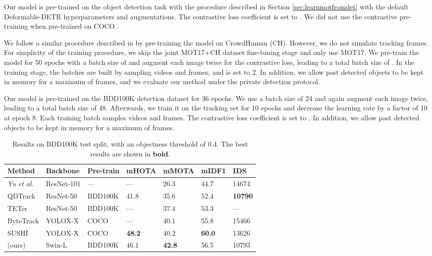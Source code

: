 Our model is pre-trained on the object detection task with the procedure described in Section \ref{sec:learnmotfromdet} with the default Deformable-DETR hyperparameters and augmentations. The contrastive loss coefficient is set to . We did not use the contrastive pre-training when pre-trained on COCO \cite{lin2014microsoft}.

 We follow a similar procedure described in \cite{zhou2020tracking} by pre-training the model on CrowdHuman (CH)\cite{shao2018crowdhuman}. However, we do not simulate tracking frames. For simplicity of the training procedure, we skip the joint MOT17+CH dataset fine-tuning stage and only use MOT17. 
We pre-train the model for 50 epochs with a batch size of  and augment each image twice for the contrastive loss, leading to a total batch size of . In the training stage, the batches are built by sampling  videos and  frames, and  is set to 2. In addition, we allow past detected objects to be kept in memory for a maximum of  frames, and we evaluate our method under the private detection protocol.

 Our model is pre-trained on the BDD100K detection dataset for 36 epochs. We use a batch size of 24 and again augment each image twice, leading to a total batch size of 48. 
Afterwards, we train it on the tracking set for 10 epochs and decrease the learning rate by a factor of 10 at epoch 8. Each training batch samples  videos and  frames. The contrastive loss coefficient is set to . In addition, we allow past detected objects to be kept in memory for a maximum of  frames.

\vspace{-0.5em}

\begin{table*}[t]
\centering \footnotesize
\begin{tabular}{lllllll}
\toprule
Method                              & Backbone  & Pre-train & mHOTA & mMOTA & mIDF1 & IDS \\ \midrule
\textit{Yu et al.} \cite{bdd100k}   & ResNet-101 & ---        & ---    & 26.3     & 44.7      & 14674 \\ 
QDTrack \cite{cvpr_qdtrack}              & ResNet-50 & BDD100K   & 41.8   & 35.6     & 52.4      & \textbf{10790} \\ 
TETer \cite{li2022TETer_tracking}   & ResNet-50 & BDD100K   & ---    & 37.4     & 53.3      & --- \\
ByteTrack \cite{ByteTrack}          & YOLOX-X   & COCO      & ---    & 40.1     & 55.8      & 15466 \\
SUSHI \cite{Cetintas_2023_CVPR}     & YOLOX-X   & COCO      & \textbf{48.2}    & 40.2     & \textbf{60.0}      & 13626 \\
\textbf{\ourmodelname{}}  (ours)              & Swin-L    & BDD100K   & 46.1 & \textbf{42.8} & 56.5     & 10793   \\
\bottomrule
\end{tabular}
\caption{Results on BDD100K test split, with an objectness threshold of 0.4. The best results are shown in \textbf{bold}.}
\label{tab:metrics-on-BDD100K-test}
\vspace{-2.0em}
\end{table*}


